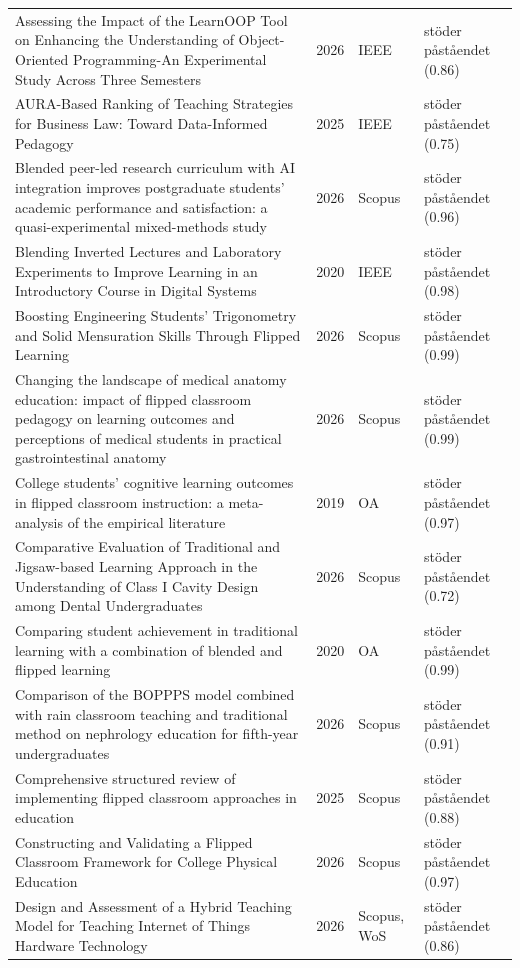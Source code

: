 \begin{longtable}{@{}%
  >{\raggedright\arraybackslash}p{}c%
  >{\raggedright\arraybackslash}p{}%
  >{\raggedright\arraybackslash}p{}@{}}
Assessing the Impact of the LearnOOP Tool on Enhancing the Understanding of Object-Oriented Programming-An Experimental Study Across Three Semesters & 2026 & IEEE & stöder påståendet (0.86) \\
AURA-Based Ranking of Teaching Strategies for Business Law: Toward Data-Informed Pedagogy & 2025 & IEEE & stöder påståendet (0.75) \\
Blended peer-led research curriculum with AI integration improves postgraduate students' academic performance and satisfaction: a quasi-experimental mixed-methods study & 2026 & Scopus & stöder påståendet (0.96) \\
Blending Inverted Lectures and Laboratory Experiments to Improve Learning in an Introductory Course in Digital Systems & 2020 & IEEE & stöder påståendet (0.98) \\
Boosting Engineering Students' Trigonometry and Solid Mensuration Skills Through Flipped Learning & 2026 & Scopus & stöder påståendet (0.99) \\
Changing the landscape of medical anatomy education: impact of flipped classroom pedagogy on learning outcomes and perceptions of medical students in practical gastrointestinal anatomy & 2026 & Scopus & stöder påståendet (0.99) \\
College students' cognitive learning outcomes in flipped classroom instruction: a meta-analysis of the empirical literature & 2019 & OA & stöder påståendet (0.97) \\
Comparative Evaluation of Traditional and Jigsaw-based Learning Approach in the Understanding of Class I Cavity Design among Dental Undergraduates & 2026 & Scopus & stöder påståendet (0.72) \\
Comparing student achievement in traditional learning with a combination of blended and flipped learning & 2020 & OA & stöder påståendet (0.99) \\
Comparison of the BOPPPS model combined with rain classroom teaching and traditional method on nephrology education for fifth-year undergraduates & 2026 & Scopus & stöder påståendet (0.91) \\
Comprehensive structured review of implementing flipped classroom approaches in education & 2025 & Scopus & stöder påståendet (0.88) \\
Constructing and Validating a Flipped Classroom Framework for College Physical Education & 2026 & Scopus & stöder påståendet (0.97) \\
Design and Assessment of a Hybrid Teaching Model for Teaching Internet of Things Hardware Technology & 2026 & Scopus, WoS & stöder påståendet (0.86) \\

\end{longtable}
